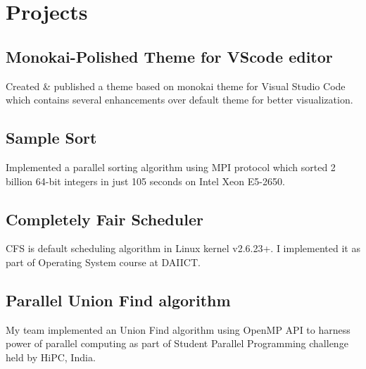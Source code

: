 \documentclass[]{deedy-resume-openfont}
\begin{document}
\hfill
\begin{minipage}[t]{0.66\textwidth} 


\section{Projects}


\subsection{Monokai-Polished Theme for VScode editor}
Created \& published a theme based on monokai theme for Visual Studio Code which contains several enhancements over default theme for better visualization.
\sectionsep

\subsection{Sample Sort}
Implemented a parallel sorting algorithm using MPI protocol which sorted 2 billion
64-bit integers in just 105 seconds on Intel Xeon E5-2650.
\sectionsep

\subsection{Completely Fair Scheduler}
CFS is default scheduling algorithm in Linux kernel v2.6.23+. I implemented it as part of
Operating System course at DAIICT.
\sectionsep

\subsection{Parallel Union Find algorithm}
My team implemented an Union Find algorithm using OpenMP API to harness power
of parallel computing as part of Student Parallel Programming challenge held by HiPC,
India.
\sectionsep


\end{minipage}
\end{document}
